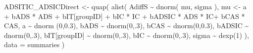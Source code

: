 \documentclass[
  10pt,
  dvipsnames,enabledeprecatedfontcommands]{scrartcl}
\newenvironment{Shaded}{\begin{snugshade}}{\end{snugshade}}
\newcommand{\AttributeTok}[1]{\textcolor[rgb]{0.77,0.63,0.00}{#1}}
\newcommand{\DecValTok}[1]{\textcolor[rgb]{0.00,0.00,0.81}{#1}}
\newcommand{\FloatTok}[1]{\textcolor[rgb]{0.00,0.00,0.81}{#1}}
\newcommand{\FunctionTok}[1]{\textcolor[rgb]{0.00,0.00,0.00}{#1}}
\newcommand{\NormalTok}[1]{#1}
\newcommand{\OtherTok}[1]{\textcolor[rgb]{0.56,0.35,0.01}{#1}}
\newcommand{\SpecialCharTok}[1]{\textcolor[rgb]{0.00,0.00,0.00}{#1}}
\begin{document}
\begin{Shaded}
\begin{Highlighting}[]
\NormalTok{ADSITIC\_ADSICDirect }\OtherTok{\textless{}{-}} \FunctionTok{quap}\NormalTok{(}
  \FunctionTok{alist}\NormalTok{(}
\NormalTok{    AdiffS }\SpecialCharTok{\textasciitilde{}} \FunctionTok{dnorm}\NormalTok{( mu, sigma ),}
\NormalTok{    mu }\OtherTok{\textless{}{-}}\NormalTok{ a }\SpecialCharTok{+}\NormalTok{ bADS }\SpecialCharTok{*}\NormalTok{ ADS }\SpecialCharTok{+}\NormalTok{  bIT[groupID] }\SpecialCharTok{+}\NormalTok{ bIC }\SpecialCharTok{*}\NormalTok{ IC }\SpecialCharTok{+}\NormalTok{ bADSIC }\SpecialCharTok{*}\NormalTok{ ADS }\SpecialCharTok{*}\NormalTok{ IC}\SpecialCharTok{+}\NormalTok{ bCAS }\SpecialCharTok{*}\NormalTok{ CAS,}
\NormalTok{    a }\SpecialCharTok{\textasciitilde{}} \FunctionTok{dnorm}\NormalTok{ (}\DecValTok{0}\NormalTok{,}\FloatTok{0.3}\NormalTok{),}
\NormalTok{    bADS }\SpecialCharTok{\textasciitilde{}} \FunctionTok{dnorm}\NormalTok{(}\DecValTok{0}\NormalTok{,.}\DecValTok{3}\NormalTok{),}
\NormalTok{    bCAS }\SpecialCharTok{\textasciitilde{}} \FunctionTok{dnorm}\NormalTok{(}\DecValTok{0}\NormalTok{,}\FloatTok{0.3}\NormalTok{),}
\NormalTok{    bADSIC }\SpecialCharTok{\textasciitilde{}} \FunctionTok{dnorm}\NormalTok{(}\DecValTok{0}\NormalTok{,.}\DecValTok{3}\NormalTok{),}
\NormalTok{    bIT[groupID] }\SpecialCharTok{\textasciitilde{}} \FunctionTok{dnorm}\NormalTok{(}\DecValTok{0}\NormalTok{,.}\DecValTok{3}\NormalTok{),}
\NormalTok{    bIC }\SpecialCharTok{\textasciitilde{}} \FunctionTok{dnorm}\NormalTok{(}\DecValTok{0}\NormalTok{,.}\DecValTok{3}\NormalTok{),}
\NormalTok{    sigma  }\SpecialCharTok{\textasciitilde{}} \FunctionTok{dexp}\NormalTok{(}\DecValTok{1}\NormalTok{)}
\NormalTok{  ), }
  \AttributeTok{data =}\NormalTok{ summaries}
\NormalTok{)}



\end{Highlighting}
\end{Shaded}
\end{document}
